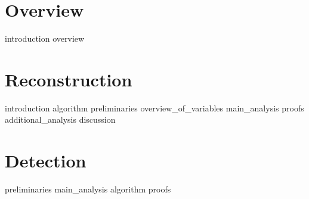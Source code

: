 \documentclass[a4paper, openany, oneside]{memoir}
\begin{document}
\chapter{Overview}

{introduction}
{overview}



\chapter{Reconstruction}

{introduction}
{algorithm}
{preliminaries}
{overview_of_variables}
{main_analysis}
{proofs}
{additional_analysis}
{discussion}

\chapter{Detection}

{preliminaries}
{main_analysis}
{algorithm}
{proofs}
\end{document}
